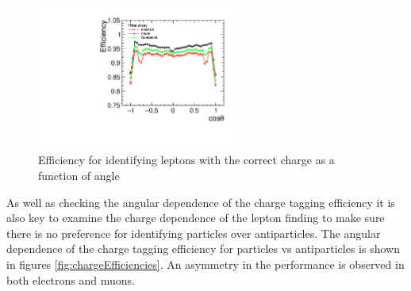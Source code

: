 \begin{figure}
  \centering
  \includegraphics[width=0.6\textwidth]{TopAnalysis/figures/NetEfficiencys}
  \caption[Charge Tagging Efficiency]{Efficiency for identifying leptons with the correct charge as a function of angle}
  \label{fig:netefficiency}
\end{figure}

As well as checking the angular dependence of the charge tagging efficiency it is also key to examine the charge dependence of the lepton finding to make sure there is no preference for identifying particles over antiparticles. The angular dependence of the charge tagging efficiency for particles vs antiparticles is shown in figures \ref{fig:chargeEfficiencies}. An asymmetry in the performance is observed in both electrons and muons.

